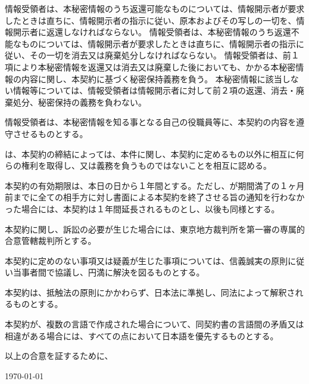 \documentclass[10pt,a4paper]{jsarticle}
\newcommand\StartDate{本日}
\begin{document}
情報受領者は、本秘密情報のうち返還可能なものについては、情報開示者が要求したときは直ちに、情報開示者の指示に従い、原本およびその写しの一切を、情報開示者に返還しなければならない。
\term 情報受領者は、本秘密情報のうち返還不能なものについては、情報開示者が要求したときは直ちに、情報開示者の指示に従い、その一切を消去又は廃棄処分しなければならない。
\term 情報受領者は、前１項により本秘密情報を返還又は消去又は廃棄した後においても、かかる本秘密情報の内容に関し、本契約に基づく秘密保持義務を負う。
\term 本秘密情報に該当しない情報等については、情報受領者は情報開示者に対して前２項の返還、消去・廃棄処分、秘密保持の義務を負わない。

情報受領者は、本秘密情報を知る事となる自己の役職員等に、本契約の内容を遵守させるものとする。

\AllMembers{}は、本契約の締結によっては、本件に関し、本契約に定めるもの以外に相互に何らの権利を取得し、又は義務を負うものではないことを相互に認める。

本契約の有効期限は、\StartDate の日から１年間とする。ただし、\AllMembers{}が期間満了の１ヶ月前までに全ての相手方に対し書面による本契約を終了させる旨の通知を行わなかった場合には、本契約は１年間延長されるものとし、以後も同様とする。

本契約に関し、訴訟の必要が生じた場合には、東京地方裁判所を第一審の専属的合意管轄裁判所とする。

本契約に定めのない事項又は疑義が生じた事項については、信義誠実の原則に従い当事者間で協議し、円満に解決を図るものとする。

本契約は、抵触法の原則にかかわらず、日本法に準拠し、同法によって解釈されるものとする。

本契約が、複数の言語で作成された場合について、同契約書の言語間の矛盾又は相違がある場合には、すべての点において日本語を優先するものとする。


\vspace{10pt}

以上の合意を証するために、{\LastSentence}


\begin{flushleft}
\today\\
\vspace{10pt}
\MakeSignatureField


\end{flushleft}
\end{document}
